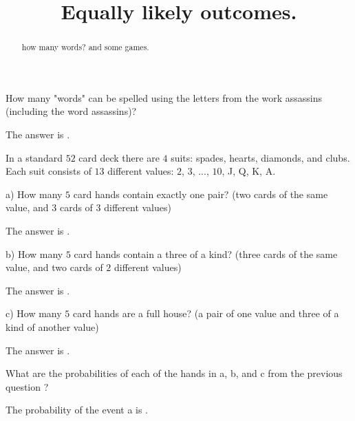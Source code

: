 \documentclass{ximera}
\title{Equally likely outcomes.}
\begin{document}
\begin{abstract}
how many words? and some games.
\end{abstract}
\maketitle

\begin{question}
How many "words" can be spelled using the letters from the work assassins (including the word assassins)?
     \begin{solution}
           The answer is .
     \end{solution}
\end{question}

In a standard $52$ card deck there are $4$ suits:  spades, hearts, diamonds, and clubs.  Each suit consists of $13$ different values:  $2$, $3$, ..., $10$, J, Q, K, A. 

\begin{question}
a)  How many $5$ card hands contain exactly one pair?  (two cards of the same value, and $3$ cards of $3$ different values)
     \begin{solution}
           The answer is .
     \end{solution}
\end{question}     

\begin{question}     
b)  How many $5$ card hands contain a three of a kind?  (three cards of the same value, and two cards of $2$ different values)
     \begin{solution}
           The answer is .
     \end{solution}
\end{question}     

\begin{question}     
c)  How many $5$ card hands are a full house?  (a pair of one value and three of a kind of another value)
     \begin{solution}
           The answer is .
     \end{solution}
\end{question}

What are the probabilities of each of the hands in a, b, and c from the previous question ?

\begin{question}
     \begin{solution}
           The probability of the event a is .
     \end{solution}
\end{question}
\end{document}
